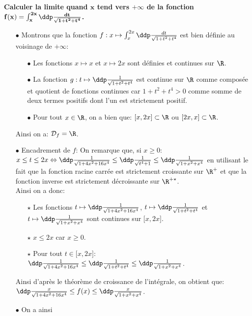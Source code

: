 \documentclass[a4paper, 11pt,reqno]{article}
\begin{document}
\begin{correction}
	\noindent \textbf{Calculer la limite quand $\mathbf{x}$ tend vers $\mathbf{+\infty}$ de la fonction $\mathbf{f(x)=\int_x^{2x} \ddp\frac{dt}{\sqrt{1+t^2+t^4}}}$.}
	\begin{itemize}
		\item[$\bullet$] Montrons que la fonction $f: x\mapsto \int_x^{2x} \ddp\frac{dt}{\sqrt{1+t^2+t^4}}$ est bien d\'efinie au voisinage de $+\infty$:
		      \begin{itemize}
			      \item[$\bullet$] Les fonctions $x\mapsto x$ et $x\mapsto 2x$ sont d\'efinies et continues sur $\R$.
			      \item[$\bullet$] La fonction $g: t\mapsto \ddp\frac{1}{\sqrt{1+t^2+t^4}}$ est continue sur $\R$ comme compos\'ee et quotient de fonctions continues car $1+t^2+t^4>0$ comme somme de deux termes positifs dont l'un est strictement positif.
			      \item[$\bullet$] Pour tout $x\in\R$, on a bien que: $\lbrack x,2x\rbrack\subset \R$ ou $\lbrack 2x,x\rbrack\subset \R$.
		      \end{itemize}
		      Ainsi on a: $\mathcal{D}_f=\R$.
		\item[$\bullet$] Encadrement de $f$:
		      \noindent On remarque que, si $x\geq 0$: $x\leq t\leq 2x \Leftrightarrow \ddp\frac{1}{\sqrt{1+4x^2+16x^4}}\leq \ddp\frac{1}{\sqrt{t^4+1}}\leq \ddp\frac{1}{\sqrt{1+x^2+x^4}}$ en utilisant le fait que la fonction racine carr\'ee est strictement croissante sur $\R^+$ et que la fonction inverse est strictement d\'ecroissante sur $\R^{+\star}$. \\
		      \noindent Ainsi on a donc:
		      \begin{itemize}
			      \item[$\star$] Les fonctions $t\mapsto \ddp\frac{1}{\sqrt{1+4x^2+16x^4}}$, $t\mapsto \ddp\frac{1}{\sqrt{1+t^2+t^4}}$ et $t\mapsto \ddp\frac{1}{\sqrt{1+x^2+x^4}}$ sont continues sur $\lbrack x,2x\rbrack$.
			      \item[$\star$] $x\leq 2x$ car $x\geq 0$.
			      \item[$\star$] Pour tout $t\in\lbrack x,2x\rbrack$: $\ddp\frac{1}{\sqrt{1+4x^2+16x^4}}\leq \ddp\frac{1}{\sqrt{1+t^2+t^4}}\leq \ddp\frac{1}{\sqrt{1+x^2+x^4}}$.
		      \end{itemize}
		      Ainsi d'apr\`{e}s le th\'eor\`{e}me de croissance de l'int\'egrale, on obtient que: $\ddp\frac{x}{\sqrt{1+4x^2+16x^4}}\leq f(x)\leq \ddp\frac{x}{\sqrt{1+x^2+x^4}}$.
		\item[$\bullet$] On a ainsi

\end{itemize}
\end{correction}
\end{document}
